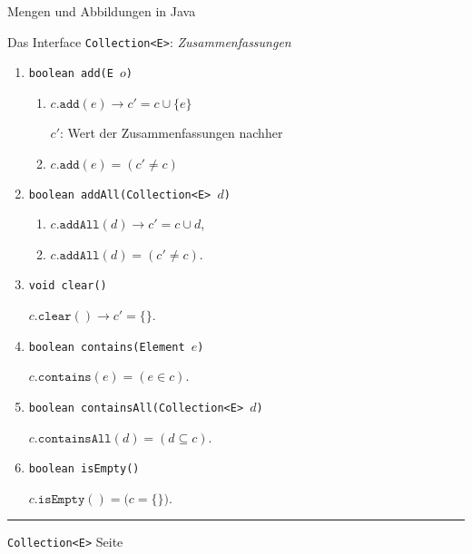 \documentclass{slides}
\newcounter{mypage}
\begin{document}
\begin{slide}{}
\normalsize

\begin{center}
Mengen und Abbildungen in Java
\end{center}
\vspace*{0.5cm}

\footnotesize
Das Interface \texttt{Collection<E>}: \emph{Zusammenfassungen}
\begin{enumerate}
\item \texttt{boolean add(E $o$)}
  
      \begin{enumerate}
      \item $c.\mathtt{add}(e) \rightarrow c' = c \cup \{ e \}$

            $c'$: Wert der Zusammenfassungen nachher
      \item $c.\mathtt{add}(e) = (c' \not= c)$
      \end{enumerate}
\item \texttt{boolean addAll(Collection<E> $d$)} 

      \begin{enumerate}
      \item $c.\mathtt{addAll}(d) \rightarrow c' = c \cup d$,
      \item $c.\mathtt{addAll}(d) = (c' \not= c)$.
      \end{enumerate}
\item \texttt{void clear()}

      \hspace*{1.3cm} $c.\mathtt{clear}() \rightarrow c' = \{\}$.
\item \texttt{boolean contains(Element $e$)}

      \hspace*{1.3cm}
      $c.\mathtt{contains}(e) = (e \in c)$.
     
\item \texttt{boolean containsAll(Collection<E> $d$)}
        
      \hspace*{1.3cm}
      $c.\mathtt{containsAll}(d) = (d \subseteq c)$.
      
\item \texttt{boolean isEmpty()}

      \hspace*{1.3cm}
      $c.\mathtt{isEmpty}() = \bigl(c = \{\}\bigr)$.
\end{enumerate}

\vspace*{\fill}
\tiny \addtocounter{mypage}{1}
\rule{17cm}{1mm}
\texttt{Collection<E>} \hspace*{\fill} Seite 
\end{slide}
\end{document}
